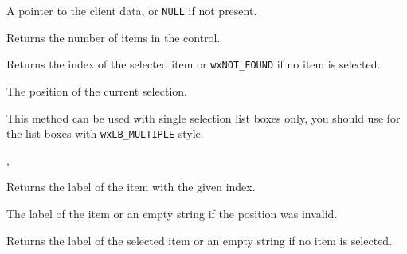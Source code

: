 

A pointer to the client data, or {\tt NULL} if not present.


\label{wxcontrolwithitemsgetcount}


Returns the number of items in the control.




\label{wxcontrolwithitemsgetselection}


Returns the index of the selected item or {\tt wxNOT\_FOUND} if no item is
selected.


The position of the current selection.


This method can be used with single selection list boxes only, you should use
 for the list boxes
with {\tt wxLB\_MULTIPLE} style.


,\rtfsp
{}


\label{wxcontrolwithitemsgetstring}


Returns the label of the item with the given index.




The label of the item or an empty string if the position was invalid.


\label{wxcontrolwithitemsgetstringselection}


Returns the label of the selected item or an empty string if no item is
selected.

